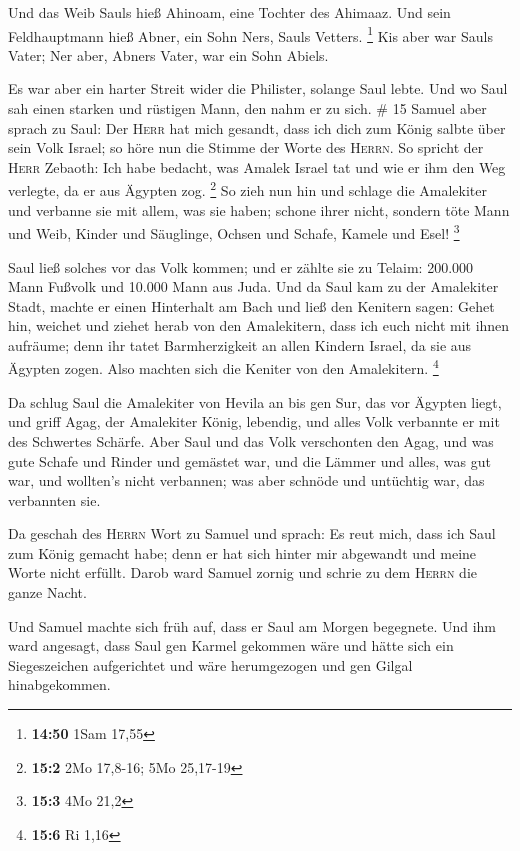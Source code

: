  Und das Weib Sauls hieß Ahinoam, eine Tochter des
Ahimaaz. Und sein Feldhauptmann hieß Abner, ein Sohn Ners, Sauls
Vetters. \footnote{\textbf{14:50} 1Sam 17,55}  Kis aber
war Sauls Vater; Ner aber, Abners Vater, war ein Sohn Abiels.

 Es war aber ein harter Streit wider die Philister,
solange Saul lebte. Und wo Saul sah einen starken und rüstigen Mann, den
nahm er zu sich. \# 15  Samuel aber sprach zu Saul: Der
\textsc{Herr} hat mich gesandt, dass ich dich zum König salbte über sein
Volk Israel; so höre nun die Stimme der Worte des \textsc{Herrn}.
 So spricht der \textsc{Herr} Zebaoth: Ich habe bedacht,
was Amalek Israel tat und wie er ihm den Weg verlegte, da er aus Ägypten
zog. \footnote{\textbf{15:2} 2Mo 17,8-16; 5Mo 25,17-19} 
So zieh nun hin und schlage die Amalekiter und verbanne sie mit allem,
was sie haben; schone ihrer nicht, sondern töte Mann und Weib, Kinder
und Säuglinge, Ochsen und Schafe, Kamele und Esel! \footnote{\textbf{15:3}
  4Mo 21,2}

 Saul ließ solches vor das Volk kommen; und er zählte sie
zu Telaim: 200.000 Mann Fußvolk und 10.000 Mann aus Juda. 
Und da Saul kam zu der Amalekiter Stadt, machte er einen Hinterhalt am
Bach  und ließ den Kenitern sagen: Gehet hin, weichet und
ziehet herab von den Amalekitern, dass ich euch nicht mit ihnen
aufräume; denn ihr tatet Barmherzigkeit an allen Kindern Israel, da sie
aus Ägypten zogen. Also machten sich die Keniter von den Amalekitern.
\footnote{\textbf{15:6} Ri 1,16}

 Da schlug Saul die Amalekiter von Hevila an bis gen Sur,
das vor Ägypten liegt,  und griff Agag, der Amalekiter
König, lebendig, und alles Volk verbannte er mit des Schwertes Schärfe.
 Aber Saul und das Volk verschonten den Agag, und was gute
Schafe und Rinder und gemästet war, und die Lämmer und alles, was gut
war, und wollten's nicht verbannen; was aber schnöde und untüchtig war,
das verbannten sie.

 Da geschah des \textsc{Herrn} Wort zu Samuel und sprach:
 Es reut mich, dass ich Saul zum König gemacht habe; denn
er hat sich hinter mir abgewandt und meine Worte nicht erfüllt. Darob
ward Samuel zornig und schrie zu dem \textsc{Herrn} die ganze Nacht.

 Und Samuel machte sich früh auf, dass er Saul am Morgen
begegnete. Und ihm ward angesagt, dass Saul gen Karmel gekommen wäre und
hätte sich ein Siegeszeichen aufgerichtet und wäre herumgezogen und gen
Gilgal hinabgekommen.

